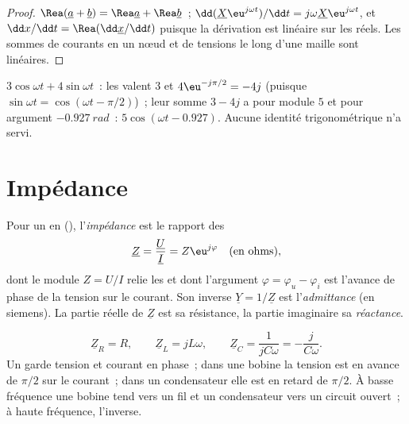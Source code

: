\begin{proof}
$\Rea(\underline a + \underline b) = \Rea\underline a + \Rea\underline b$~;
$\dd(\underline X\eu^{j\omega t})/\dd t = j\omega\underline X\eu^{j\omega t}$,
et $\dd x/\dd t = \Rea(\dd\underline x/\dd t)$ puisque la dérivation est
linéaire sur les réels. Les sommes de courants en un nœud et de tensions
le long d'une maille sont linéaires.
\end{proof}

\begin{example}\label{ex:b1:sinusoidal-impedance:add}
$3\cos\omega t + 4\sin\omega t$~: les  valent $3$ et
$4\eu^{-j\pi/2} = -4j$ (puisque $\sin\omega t = \cos(\omega t - \pi/2)$)~;
leur somme $3 - 4j$ a pour module $5$ et pour argument $-0.927\ \unit{rad}$~:
$5\cos(\omega t - 0.927)$. Aucune identité trigonométrique n'a servi.
\end{example}

\section{Impédance}

\begin{definition}\label{def:b1:sinusoidal-impedance:impedance}
Pour un  en  (), l'\emph{impédance} est le rapport des 
\[
\underline Z = \frac{\underline U}{\underline I} = Z\eu^{j\varphi}
\quad (\text{en ohms}),
\]
dont le module $Z = U/I$ relie les  et dont l'argument
$\varphi = \varphi_u - \varphi_i$ est l'avance de phase de la tension
sur le courant. Son inverse $\underline Y = 1/\underline Z$ est
l'\emph{admittance} (en siemens). La partie réelle de $\underline Z$ est
sa résistance, la partie imaginaire sa \emph{réactance}.
\end{definition}

\begin{proposition}[Impédances de R, L, C]\label{prop:b1:sinusoidal-impedance:rlc}
\[
\underline Z_R = R, \qquad \underline Z_L = jL\omega, \qquad
\underline Z_C = \frac{1}{jC\omega} = -\frac{j}{C\omega} .
\]
Un  garde tension et courant en phase~; dans une
bobine la tension est en avance de $\pi/2$ sur le courant~; dans un
condensateur elle est en retard de $\pi/2$. À basse fréquence une bobine
tend vers un fil et un condensateur vers un circuit ouvert~; à haute
fréquence, l'inverse.
\end{proposition}

